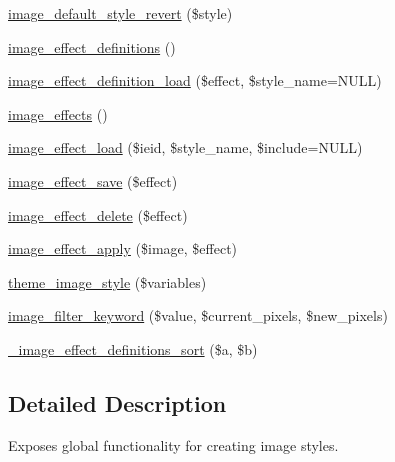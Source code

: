 \begin{DoxyCompactItemize}
\item 
\hyperlink{image_8module_af8b1ed6a3a3ac9e694c06f852075172e}{image\_\-default\_\-style\_\-revert} (\$style)
\item 
\hyperlink{image_8module_a8b4b01544349854c77bad8727d52f7d1}{image\_\-effect\_\-definitions} ()
\item 
\hyperlink{image_8module_a91383fe83b2a2da4c90b4221e48abf6a}{image\_\-effect\_\-definition\_\-load} (\$effect, \$style\_\-name=NULL)
\item 
\hyperlink{image_8module_ae0237054a43c19118bf13e609e5cff8b}{image\_\-effects} ()
\item 
\hyperlink{image_8module_a7ad62224057dbc7757dfa2df898926ad}{image\_\-effect\_\-load} (\$ieid, \$style\_\-name, \$include=NULL)
\item 
\hyperlink{image_8module_aafc029da510317ef4aaf45be74864f17}{image\_\-effect\_\-save} (\$effect)
\item 
\hyperlink{image_8module_abb2f70cfdb563527af8f05eb81aee202}{image\_\-effect\_\-delete} (\$effect)
\item 
\hyperlink{image_8module_a94560c78e1736e12dcc85fd2f16b5d3a}{image\_\-effect\_\-apply} (\$image, \$effect)
\item 
\hyperlink{group__themeable_ga18305f3777e7a1e9e5ffcf253b39bbd5}{theme\_\-image\_\-style} (\$variables)
\item 
\hyperlink{image_8module_a4d9e07c3779bccf249a6d294778b9b41}{image\_\-filter\_\-keyword} (\$value, \$current\_\-pixels, \$new\_\-pixels)
\item 
\hyperlink{image_8module_ac764a8c22c22632edf4633c68b6f3223}{\_\-image\_\-effect\_\-definitions\_\-sort} (\$a, \$b)
\end{DoxyCompactItemize}


\subsection{Detailed Description}
Exposes global functionality for creating image styles. 

